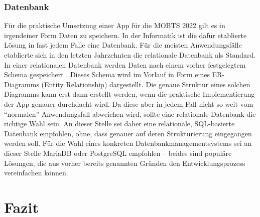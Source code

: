 \subsubsection*{Datenbank}
Für die praktische Umsetzung einer App für die MOBTS 2022 gilt es in irgendeiner Form Daten zu speichern.
In der Informatik ist die dafür etablierte Lösung in fast jedem Falle eine Datenbank.
Für die meisten Anwendungsfälle etablierte sich in den letzten Jahrzehnten die relationale Datenbank als Standard.
In einer relationalen Datenbank werden Daten nach einem vorher festgelegtem Schema gespeichert \autocite{B_AWS.o.J.}.
Dieses Schema wird im Vorlauf in Form eines ER-Diagramms (Entity Relationship) dargestellt.
Die genaue Struktur eines solchen Diagramms kann erst dann erstellt werden, wenn die praktische Implementierung der App genauer durchdacht wird.
Da diese aber in jedem Fall nicht so weit vom \enquote{normalen} Anwendungsfall abweichen wird, sollte eine relationale Datenbank die richtige Wahl sein.
An dieser Stelle sei daher eine relationale, SQL-basierte Datenbank empfohlen, ohne, dass genauer auf deren Strukturierung eingegangen werden soll.
Für die Wahl eines konkreten Datenbankmanagementsystems sei an dieser Stelle MariaDB oder PostgreSQL empfohlen -- beides sind populäre Lösungen, die aus vorher bereits genannten Gründen den Entwicklungsprozess vereinfachen können.

\section{Fazit}